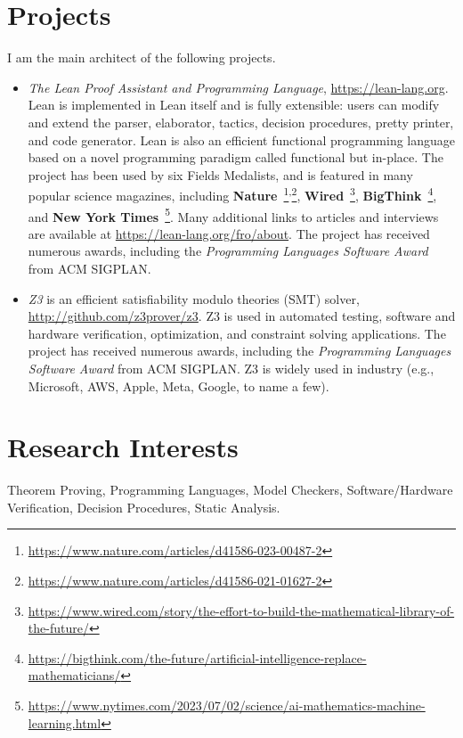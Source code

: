 \documentclass[11pt,a4paper]{article}
\begin{document}
\section*{Projects}

I am the main architect of the following projects.

\begin{itemize}[leftmargin=*,itemsep=0.8ex]
\item {\em The Lean Proof Assistant and Programming Language}, \url{https://lean-lang.org}.
Lean is implemented in Lean itself and is fully extensible: users can modify and extend the parser, elaborator,
tactics, decision procedures, pretty printer, and code generator.
Lean is also an efficient functional programming language based on a novel programming paradigm called functional but in-place.
The project has been used by six Fields Medalists, and is featured in many popular science magazines, including
{\bf Nature}~\footnote{\url{https://www.nature.com/articles/d41586-023-00487-2}}\textsuperscript{,}\footnote{\url{https://www.nature.com/articles/d41586-021-01627-2}},
  {\bf Wired}~\footnote{\url{https://www.wired.com/story/the-effort-to-build-the-mathematical-library-of-the-future/}},
  {\bf BigThink}~\footnote{\url{https://bigthink.com/the-future/artificial-intelligence-replace-mathematicians/}},
  and {\bf New York Times}~\footnote{\url{https://www.nytimes.com/2023/07/02/science/ai-mathematics-machine-learning.html}}.
  Many additional links to articles and interviews are available at \url{https://lean-lang.org/fro/about}.
  The project has received numerous awards, including the {\em Programming Languages Software Award} from ACM SIGPLAN.

\item {\em Z3} is an efficient satisfiability modulo theories (SMT) solver, \url{http://github.com/z3prover/z3}.
  Z3 is used in automated testing, software and hardware verification, optimization, and constraint solving applications.
  The project has received numerous awards, including the {\em Programming Languages Software Award} from ACM SIGPLAN.
  Z3 is widely used in industry (e.g., Microsoft, AWS, Apple, Meta, Google, to name a few).
\end{itemize}

\section*{Research Interests}

Theorem Proving, Programming Languages, Model Checkers, Software/Hardware Verification, Decision Procedures, Static Analysis.
\end{document}
